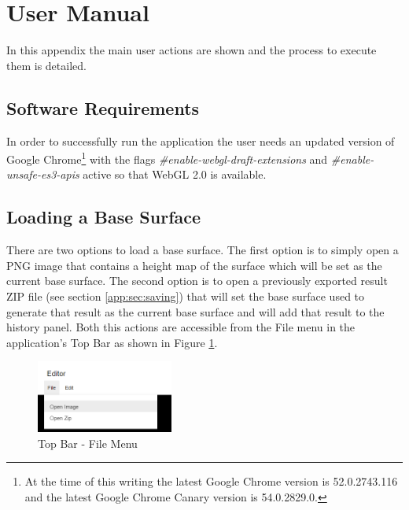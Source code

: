 \section{User Manual}
  
  \renewcommand\imagewidth{0.4\textwidth}
  
  In this appendix the main user actions are shown and the process to execute them is detailed.
 
  \subsection {Software Requirements}
  
    In order to successfully run the application the user needs an updated version of Google Chrome\footnote{At the time of this writing the latest Google Chrome version is 52.0.2743.116 and the latest Google Chrome Canary version is 54.0.2829.0.} with the flags \textit{\#enable-webgl-draft-extensions} and \textit{\#enable-unsafe-es3-apis} active so that WebGL 2.0 is available.
      
  \subsection {Loading a Base Surface}
  
    There are two options to load a base surface. The first option is to simply open a PNG image that contains a height map of the surface which will be set as the current base surface. The second option is to open a previously exported result ZIP file (see section \ref{app:sec:saving}) that will set the base surface used to generate that result as the current base surface and will add that result to the history panel. Both this actions are accessible from the File menu in the application's Top Bar as shown in Figure \ref{fig:topbar-filemenu}.
  
    \begin{figure}[H]
      \centering
      \includegraphics[width=\imagewidth]{images/screenshots/TopBar-FileMenu}
      \caption{Top Bar - File Menu}
      \label{fig:topbar-filemenu}
    \end{figure}
  
